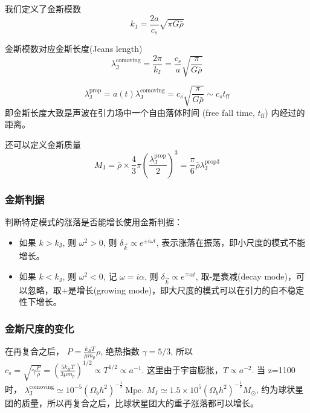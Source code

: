\documentclass[12pt]{ctexart}
\begin{document}
我们定义了金斯模数
\begin{equation}
    k_\text{J} = \frac{2a}{c_s} \sqrt{\pi G \bar{\rho}}
\end{equation}

金斯模数对应金斯长度(Jeans length)
\begin{equation}
    \lambda_\text{J}^\text{comoving} = \frac{2\pi }{k_\text{J}} = \frac{c_s}{a} \sqrt{\frac{\pi}{G \bar{\rho}} }
\end{equation}

\begin{equation}
    \lambda_\text{J}^\text{prop} = a(t)\lambda_\text{J}^\text{comoving} = c_s\sqrt{\frac{\pi}{G\bar{\rho}}} \sim c_s t_\text{ff}
\end{equation}
即金斯长度大致是声波在引力场中一个自由落体时间 (free fall time, $t_\text{ff}$) 内经过的距离。

还可以定义金斯质量
\begin{equation}
    M_\text{J} = \bar{\rho} \times \frac{4}{3} \pi \left(\frac{\lambda_\text{J}^\text{prop}}{2}\right)^3  = \frac{\pi}{6}\bar{\rho} \lambda_\text{J}^{\text{prop} 3}
\end{equation}

\subsubsection{金斯判据}
判断特定模式的涨落是否能增长使用金斯判据：
\begin{itemize}
    \item 如果 $k>k_\text{J}$, 则 $\omega^2>0$, 则 $\delta_{\vec{k}}\propto e^{\pm i\omega t}$, 表示涨落在振荡，即小尺度的模式不能增长。
    \item 如果 $k<k_\text{J}$, 则 $\omega^2<0$, 记 $\omega=i\alpha$, 则 $\delta_{\vec{k}}\propto e^{\mp \alpha t}$, 取-是衰减(decay mode)，可以忽略，取+是增长(growing mode)，即大尺度的模式可以在引力的自不稳定性下增长。
\end{itemize}

\subsubsection{金斯尺度的变化}
在再复合之后，
$P=\frac{k_{B}T}{\mu m_p}\rho$,
绝热指数 $\gamma =5/3$, 
所以 $c_s=\sqrt{\gamma \frac{P}{\rho}} =\left(\frac{5k_B T}{3\mu m_p}\right)^{1/2} \propto T^{1/2} \propto a^{-1}$. 这里由于宇宙膨胀，$T\propto a^{-2}$.
当 z=1100 时，
$\lambda_\text{J}^\text{comoving} \simeq 10^{-5}  \left(\Omega_b h^2\right)^{-\frac{1}{2}} \mathrm{~Mpc}$.
$M_\text{J} \simeq 1.5\times 10^5 \left(\Omega_b h^2\right)^{-\frac{1}{2}} M_\odot$, 约为球状星团的质量，所以再复合之后，比球状星团大的重子涨落都可以增长。
\end{document}
